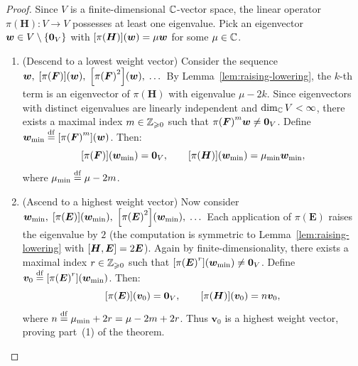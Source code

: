 \documentclass[11pt,reqno]{amsart}
\begin{document}
\begin{proof}
Since $V$ is a finite-dimensional $\mathbb{C}$-vector space,
the linear operator $\pi(\bm H):V\to V$ possesses at least one eigenvalue.
Pick an eigenvector $\bm w\in V\setminus\set{\bm0_V}$ with
$\FUNC{\pi(\bm H)}{\bm w}=\mu \bm w$ for some $\mu\in\mathbb{C}$.

\begin{enumerate}
\item (Descend to a lowest weight vector)
Consider the sequence
$\bm w,\;\FUNC{\pi(\bm F)}{\bm w},\;\FUNC{\pi\Br{\bm F}^2}{\bm w},\;\dots$
By Lemma~\ref{lem:raising-lowering}, the $k$-th term is an eigenvector of
$\pi(\bm H)$ with eigenvalue $\mu-2k$.
Since eigenvectors with distinct eigenvalues are linearly independent and
$\dim_{\mathbb{C}} V<\infty$, there exists a maximal index
$m\in\mathbb{Z}_{\geqslant 0}$ such that $\pi\Br{\bm F}^m \bm w\neq\bm0_V$.
Define $\bm{w}_{\min}\df\FUNC{\pi\Br{\bm F}^m}{\bm w}$.
Then:
\[
\FUNC{\pi(\bm F)}{\bm{w}_{\min}}=\bm0_V,\qquad
\FUNC{\pi(\bm H)}{\bm{w}_{\min}}=\mu_{\min}\bm{w}_{\min},
\]
where $\mu_{\min}\stackrel{\mathrm{df}}{=}\mu-2m$.

\item (Ascend to a highest weight vector)
Now consider
$\bm{w}_{\min},\;\FUNC{\pi(\bm E)}{\bm{w}_{\min}},\;
\FUNC{\pi\Br{\bm E}^2}{\bm{w}_{\min}},\;\dots$
Each application of $\pi(\bm E)$ raises the eigenvalue by $2$
(the computation is symmetric to Lemma~\ref{lem:raising-lowering}
with $\SqBr{\bm H,\bm E}=2\bm E$).
Again by finite-dimensionality, there exists a maximal index
$r\in\mathbb{Z}_{\geqslant 0}$ such that $\FUNC{\pi\Br{\bm E}^r}{\bm{w}_{\min}}\neq\bm0_V$.
Define
$\bm{v}_0\df\FUNC{\pi\Br{\bm E}^r}{\bm{w}_{\min}}$.
Then:
\[
\FUNC{\pi(\bm E)}{\bm{v}_0}=\bm0_V,\qquad
\FUNC{\pi(\bm H)}{\bm{v}_0}=n \bm{v}_0,
\]
where $n\stackrel{\mathrm{df}}{=}\mu_{\min}+2r=\mu-2m+2r$.
Thus $\bm{v}_0$ is a highest weight vector, proving part~(1) of the theorem.


\end{enumerate}
\end{proof}
\end{document}
